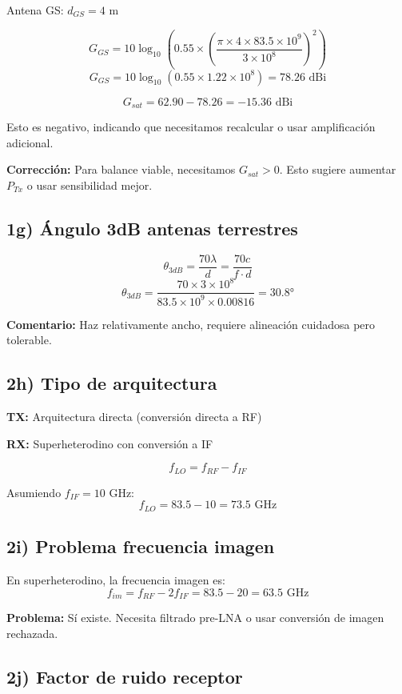 \documentclass[a4paper,11pt]{article}
\begin{document}
Antena GS: $d_{GS} = 4$ m

$$G_{GS} = 10\log_{10}\left(0.55 \times \left(\frac{\pi \times 4 \times 83.5 \times 10^9}{3 \times 10^8}\right)^2\right)$$
$$G_{GS} = 10\log_{10}(0.55 \times 1.22 \times 10^8) = 78.26 \text{ dBi}$$

$$G_{sat} = 62.90 - 78.26 = -15.36 \text{ dBi}$$

Esto es negativo, indicando que necesitamos recalcular o usar amplificación adicional.

\textbf{Corrección:} Para balance viable, necesitamos $G_{sat} > 0$. Esto sugiere aumentar $P_{Tx}$ o usar sensibilidad mejor.

\subsection*{1g) Ángulo 3dB antenas terrestres}

$$\theta_{3dB} = \frac{70 \lambda}{d} = \frac{70 c}{f \cdot d}$$
$$\theta_{3dB} = \frac{70 \times 3 \times 10^8}{83.5 \times 10^9 \times 0.00816} = 30.8°$$

\textbf{Comentario:} Haz relativamente ancho, requiere alineación cuidadosa pero tolerable.

\subsection*{2h) Tipo de arquitectura}

\textbf{TX:} Arquitectura directa (conversión directa a RF)

\textbf{RX:} Superheterodino con conversión a IF

$$f_{LO} = f_{RF} - f_{IF}$$

Asumiendo $f_{IF} = 10$ GHz:
$$f_{LO} = 83.5 - 10 = 73.5 \text{ GHz}$$

\subsection*{2i) Problema frecuencia imagen}

En superheterodino, la frecuencia imagen es:
$$f_{im} = f_{RF} - 2f_{IF} = 83.5 - 20 = 63.5 \text{ GHz}$$

\textbf{Problema:} Sí existe. Necesita filtrado pre-LNA o usar conversión de imagen rechazada.

\subsection*{2j) Factor de ruido receptor}
\end{document}
